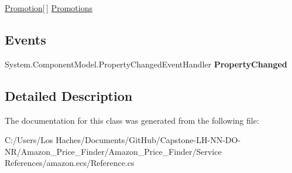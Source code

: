 \begin{DoxyCompactItemize}
\begin{DoxyCompactList}\small\item\em \end{DoxyCompactList}\item 
\hypertarget{class_amazon___price___finder_1_1amazon_1_1ecs_1_1_offer_a39073bce0f1e5d2a7cef81ceb076dde7}{\hyperlink{class_amazon___price___finder_1_1amazon_1_1ecs_1_1_promotion}{Promotion}\mbox{[}$\,$\mbox{]} \hyperlink{class_amazon___price___finder_1_1amazon_1_1ecs_1_1_offer_a39073bce0f1e5d2a7cef81ceb076dde7}{Promotions}}\label{class_amazon___price___finder_1_1amazon_1_1ecs_1_1_offer_a39073bce0f1e5d2a7cef81ceb076dde7}

\begin{DoxyCompactList}\small\item\em \end{DoxyCompactList}\end{DoxyCompactItemize}
\subsection*{Events}
\begin{DoxyCompactItemize}
\item 
\hypertarget{class_amazon___price___finder_1_1amazon_1_1ecs_1_1_offer_a673d5af4bc1ec67157214a47fe9da6fa}{System.\-Component\-Model.\-Property\-Changed\-Event\-Handler {\bfseries Property\-Changed}}\label{class_amazon___price___finder_1_1amazon_1_1ecs_1_1_offer_a673d5af4bc1ec67157214a47fe9da6fa}

\end{DoxyCompactItemize}


\subsection{Detailed Description}


The documentation for this class was generated from the following file\-:\begin{DoxyCompactItemize}
\item 
C\-:/\-Users/\-Los Haches/\-Documents/\-Git\-Hub/\-Capstone-\/\-L\-H-\/\-N\-N-\/\-D\-O-\/\-N\-R/\-Amazon\-\_\-\-Price\-\_\-\-Finder/\-Amazon\-\_\-\-Price\-\_\-\-Finder/\-Service References/amazon.\-ecs/Reference.\-cs\end{DoxyCompactItemize}
